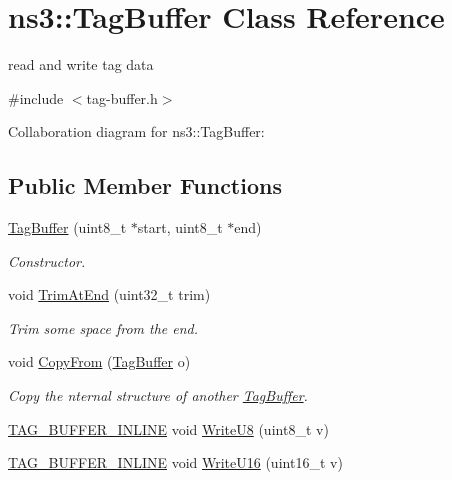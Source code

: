 \hypertarget{classns3_1_1TagBuffer}{}\section{ns3\+:\+:Tag\+Buffer Class Reference}
\label{classns3_1_1TagBuffer}


read and write tag data  




{\ttfamily \#include $<$tag-\/buffer.\+h$>$}



Collaboration diagram for ns3\+:\+:Tag\+Buffer\+:
\subsection*{Public Member Functions}
\begin{DoxyCompactItemize}
\item 
\hyperlink{classns3_1_1TagBuffer_a06181a095e00277acbca5bb6a072e055}{Tag\+Buffer} (uint8\+\_\+t $\ast$start, uint8\+\_\+t $\ast$end)
\begin{DoxyCompactList}\small\item\em Constructor. \end{DoxyCompactList}\item 
void \hyperlink{classns3_1_1TagBuffer_a163314c17e95305cecd202eb0496affa}{Trim\+At\+End} (uint32\+\_\+t trim)
\begin{DoxyCompactList}\small\item\em Trim some space from the end. \end{DoxyCompactList}\item 
void \hyperlink{classns3_1_1TagBuffer_afe07a9e117449ff5b5d5857291671349}{Copy\+From} (\hyperlink{classns3_1_1TagBuffer}{Tag\+Buffer} o)
\begin{DoxyCompactList}\small\item\em Copy the nternal structure of another \hyperlink{classns3_1_1TagBuffer}{Tag\+Buffer}. \end{DoxyCompactList}\item 
\hyperlink{tag-buffer_8h_a8e389298c53aa29f5ba6ee36ab9c8057}{T\+A\+G\+\_\+\+B\+U\+F\+F\+E\+R\+\_\+\+I\+N\+L\+I\+NE} void \hyperlink{classns3_1_1TagBuffer_a75098eafbb40382166603f99d1149c0b}{Write\+U8} (uint8\+\_\+t v)
\item 
\hyperlink{tag-buffer_8h_a8e389298c53aa29f5ba6ee36ab9c8057}{T\+A\+G\+\_\+\+B\+U\+F\+F\+E\+R\+\_\+\+I\+N\+L\+I\+NE} void \hyperlink{classns3_1_1TagBuffer_ae87cc12a9468ba10511980da091184e4}{Write\+U16} (uint16\+\_\+t v)

\end{DoxyCompactItemize}
